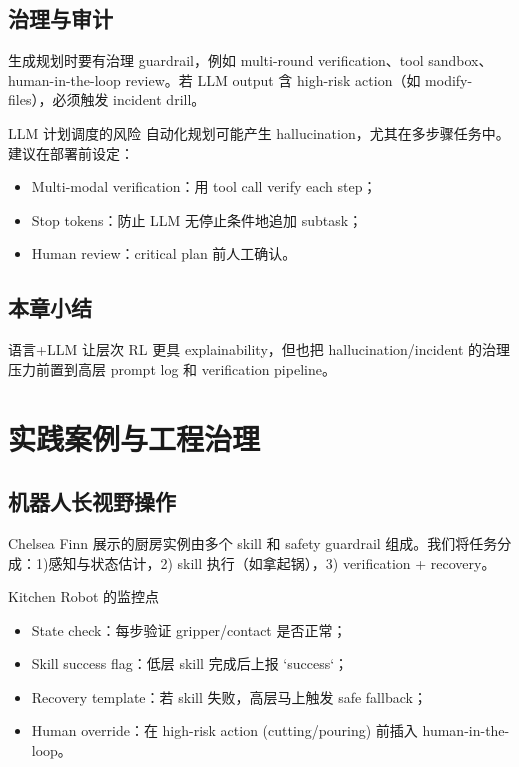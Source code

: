 \documentclass[a4paper]{article}
\begin{document}
\subsection{治理与审计}

生成规划时要有治理 guardrail，例如 multi-round verification、tool sandbox、human-in-the-loop review。若 LLM output 含 high-risk action（如 modify-files），必须触发 incident drill。

\begin{warningbox}{LLM 计划调度的风险}
自动化规划可能产生 hallucination，尤其在多步骤任务中。建议在部署前设定：
\begin{itemize}
    \item Multi-modal verification：用 tool call verify each step；
    \item Stop tokens：防止 LLM 无停止条件地追加 subtask；
    \item Human review：critical plan 前人工确认。
\end{itemize}
\end{warningbox}

\subsection{本章小结}

语言+LLM 让层次 RL 更具 explainability，但也把 hallucination/incident 的治理压力前置到高层 prompt log 和 verification pipeline。

\section{实践案例与工程治理}

\subsection{机器人长视野操作}

Chelsea Finn 展示的厨房实例由多个 skill 和 safety guardrail 组成。我们将任务分成：1)感知与状态估计，2) skill 执行（如拿起锅），3) verification + recovery。

\begin{knowledgebox}{Kitchen Robot 的监控点}
\begin{itemize}
    \item State check：每步验证 gripper/contact 是否正常；
    \item Skill success flag：低层 skill 完成后上报 `success`；
    \item Recovery template：若 skill 失败，高层马上触发 safe fallback；
    \item Human override：在 high-risk action (cutting/pouring) 前插入 human-in-the-loop。
\end{itemize}
\end{knowledgebox}
\end{document}
